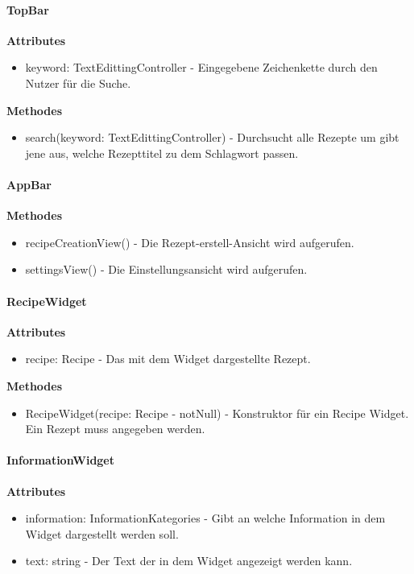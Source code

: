 \documentclass[parskip=full]{scrartcl}
\begin{document}
        \paragraph{TopBar}
            \textbf{Attributes}
                \begin{itemize}
                    \item keyword: TextEdittingController - Eingegebene Zeichenkette durch den Nutzer für die Suche.
                \end{itemize}
            \textbf{Methodes}
                \begin{itemize}
                    \item search(keyword: TextEdittingController) - Durchsucht alle Rezepte um gibt jene aus, welche Rezepttitel zu dem Schlagwort passen.
                \end{itemize}
                
        \paragraph{AppBar}
            \textbf{Methodes}
                \begin{itemize}
                    \item recipeCreationView() - Die Rezept-erstell-Ansicht wird aufgerufen.
                    \item settingsView() - Die Einstellungsansicht wird aufgerufen.
                \end{itemize}

        \paragraph{RecipeWidget}
            \textbf{Attributes}
                 \begin{itemize}
                     \item recipe: Recipe - Das mit dem Widget dargestellte Rezept.
                 \end{itemize}
            \textbf{Methodes}
                \begin{itemize}
                    \item RecipeWidget(recipe: Recipe - notNull) - Konstruktor für ein Recipe Widget. Ein Rezept muss angegeben werden.
                \end{itemize}
                
        \paragraph{InformationWidget}
            \textbf{Attributes}
                \begin{itemize}
                    \item information: InformationKategories - Gibt an welche Information in dem Widget dargestellt werden soll.
                    \item text: string - Der Text der in dem Widget angezeigt werden kann.
                \end{itemize}
\end{document}
